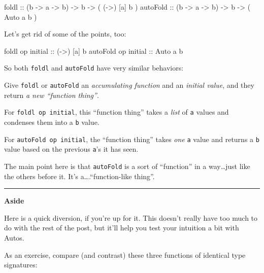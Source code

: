 \documentclass[]{article}
\newenvironment{Shaded}{}{}
\newcommand{\DataTypeTok}[1]{\textcolor[rgb]{0.56,0.13,0.00}{#1}}
\newcommand{\NormalTok}[1]{#1}
\newcommand{\OtherTok}[1]{\textcolor[rgb]{0.00,0.44,0.13}{#1}}
\begin{document}
\begin{Shaded}
\begin{Highlighting}[]
\NormalTok{foldl}\OtherTok{      ::}\NormalTok{ (b }\OtherTok{->}\NormalTok{ a }\OtherTok{->}\NormalTok{ b) }\OtherTok{->}\NormalTok{ b }\OtherTok{->}\NormalTok{ ( (}\OtherTok{->}\NormalTok{) [a] b )}
\OtherTok{autoFold   ::}\NormalTok{ (b }\OtherTok{->}\NormalTok{ a }\OtherTok{->}\NormalTok{ b) }\OtherTok{->}\NormalTok{ b }\OtherTok{->}\NormalTok{ ( }\DataTypeTok{Auto}\NormalTok{  a  b )}
\end{Highlighting}
\end{Shaded}

Let's get rid of some of the points, too:

\begin{Shaded}
\begin{Highlighting}[]
\NormalTok{foldl    op}\OtherTok{ initial  ::}\NormalTok{ (}\OtherTok{->}\NormalTok{) [a] b}
\NormalTok{autoFold op}\OtherTok{ initial  ::} \DataTypeTok{Auto}\NormalTok{  a  b}
\end{Highlighting}
\end{Shaded}

So both \texttt{foldl} and \texttt{autoFold} have very similar behaviors:

Give \texttt{foldl} or \texttt{autoFold} an \emph{accumulating function} and an
\emph{initial value}, and they return \emph{a new ``function thing''}.

For \texttt{foldl\ op\ initial}, this ``function thing'' takes a \emph{list} of
\texttt{a} values and condenses them into a \texttt{b} value.

For \texttt{autoFold\ op\ initial}, the ``function thing'' takes \emph{one}
\texttt{a} value and returns a \texttt{b} value based on the previous
\texttt{a}'s it has seen.

The main point here is that \texttt{autoFold} is a sort of ``function'' in a
way\ldots{}just like the others before it. It's a\ldots{}.``function-like
thing''.

\begin{center}\rule{0.5\linewidth}{\linethickness}\end{center}

\textbf{Aside}

Here is a quick diversion, if you're up for it. This doesn't really have too
much to do with the rest of the post, but it'll help you test your intuition a
bit with Autos.

As an exercise, compare (and contrast) these three functions of identical type
signatures:
\end{document}
